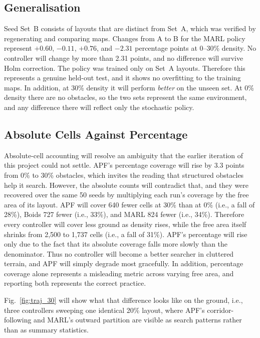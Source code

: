 \documentclass[a4paper, 10pt, conference]{ieeeconf}
\begin{document}
\subsection{Generalisation}\label{sec:generalisation}

Seed Set~B consists of layouts that are distinct from Set~A, which was
verified by regenerating and comparing maps. Changes from A to B for
the MARL policy represent $+0.60$, $-0.11$, $+0.76$, and $-2.31$
percentage points at 0--30\% density. No controller will change by
more than 2.31 points, and no difference will survive Holm correction.
The policy was trained only on Set~A layouts. Therefore this
represents a genuine held-out test, and it shows no overfitting to the
training maps. In addition, at 30\% density it will perform
\emph{better} on the unseen set. At 0\% density there are no
obstacles, so the two sets represent the same environment, and any
difference there will reflect only the stochastic policy.

\subsection{Absolute Cells Against Percentage}\label{sec:absolute}


Absolute-cell accounting will resolve an ambiguity that the earlier
iteration of this project could not settle. APF's percentage coverage
will rise by 3.3 points from 0\% to 30\% obstacles, which invites the
reading that structured obstacles help it search. However, the
absolute counts will contradict that, and they were recovered over the
same 50 seeds by multiplying each run's coverage by the free area of
its layout. APF will cover 640 fewer cells at 30\% than at 0\% (i.e.,
a fall of 28\%), Boids 727 fewer (i.e., 33\%), and MARL 824 fewer
(i.e., 34\%). Therefore every controller will cover less ground as
density rises, while the free area itself shrinks from 2{,}500 to
1{,}737 cells (i.e., a fall of 31\%). APF's percentage will rise only
due to the fact that its absolute coverage falls more slowly than the
denominator. Thus no controller will become a better searcher in
cluttered terrain, and APF will simply degrade most gracefully. In
addition, percentage coverage alone represents a misleading metric
across varying free area, and reporting both represents the correct
practice.

Fig.~\ref{fig:traj_30} will show what that difference looks like on
the ground, i.e., three controllers sweeping one identical 20\%
layout, where APF's corridor-following and MARL's outward partition
are visible as search patterns rather than as summary statistics.
\end{document}
